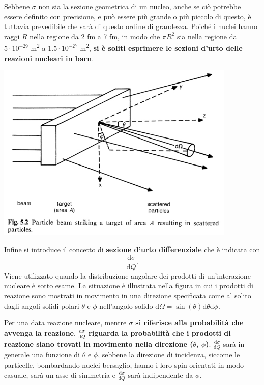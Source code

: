 \documentclass[a4paper,11pt,twoside,openany]{book}
\theoremstyle{definition}
\theoremstyle{plain}
\theoremstyle{plain}
\theoremstyle{definition}
\begin{document}
Sebbene $\sigma$ non sia la sezione geometrica di un nucleo, anche se ciò potrebbe essere definito con precisione, e può essere più grande o più piccolo di questo, è tuttavia prevedibile che sarà di questo ordine di grandezza. Poiché i nuclei hanno raggi $R$ nella regione da 2 fm a 7 fm, in modo che $\pi R^2$ sia nella regione da $5 \cdot 10^{-29}$ \si{m^2} a $1.5 \cdot 10^{-27}$ \si{m^2}, \textbf{si è soliti esprimere le sezioni d'urto delle reazioni nucleari in barn}.

\begin{center}
\includegraphics[width=4.5in]{immagini/cross-section-2.jpg} %
\end{center}

Infine si introduce il concetto di \textbf{sezione d'urto differenziale} che è indicata con $$\frac{\textrm{d}\sigma}{\textrm{d}Q}.$$ Viene utilizzato quando la distribuzione angolare dei prodotti di un'interazione nucleare è sotto esame. La situazione è illustrata nella figura in cui i prodotti di reazione sono mostrati in movimento in una direzione specificata come al solito dagli angoli solidi polari $\theta$ e $\phi$ nell'angolo solido $\textrm{d}\Omega=\sin\left(\theta\right)\textrm{d}\theta\textrm{d}\phi$.

Per una data reazione nucleare, mentre \textbf{$\sigma$ si riferisce alla probabilità che avvenga la reazione}, \textbf{$\frac{\textrm{d}\sigma}{\textrm{d}Q}$ riguarda la probabilità che i prodotti di reazione siano trovati in movimento nella direzione ($\theta$, $\phi$)}. $\frac{\textrm{d}\sigma}{\textrm{d}Q}$ sarà in generale una funzione di $\theta$ e $\phi$, sebbene la direzione di incidenza, siccome le particelle, bombardando nuclei bersaglio, hanno i loro spin orientati in modo casuale, sarà un asse di simmetria e $\frac{\textrm{d}\sigma}{\textrm{d}Q}$ sarà indipendente da $\phi$.
\end{document}
